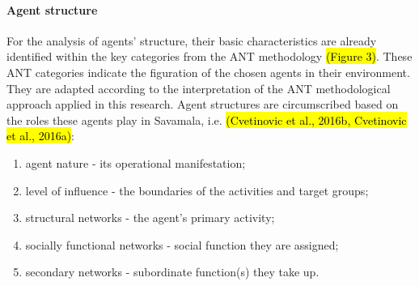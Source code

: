\documentclass[11pt]{report}
\begin{document}
\paragraph{Agent structure}
For the analysis of agents' structure, their basic characteristics are already identified within the key categories from the ANT methodology \hl{(Figure 3)}.
These ANT categories indicate the figuration of the chosen agents in their environment. They are adapted according to the interpretation of the ANT methodological approach applied in this research.
Agent structures are circumscribed based on the roles these agents play in Savamala, i.e. \hl{(Cvetinovic et al., 2016b, Cvetinovic et al., 2016a)}:
\begin{enumerate}
\item agent nature - its operational manifestation;
\item level of influence - the boundaries of the activities and target groups;
\item structural networks - the agent’s primary activity;
\item socially functional networks - social function they are assigned;
\item secondary networks - subordinate function(s) they take up.
\end{enumerate}
\end{document}
